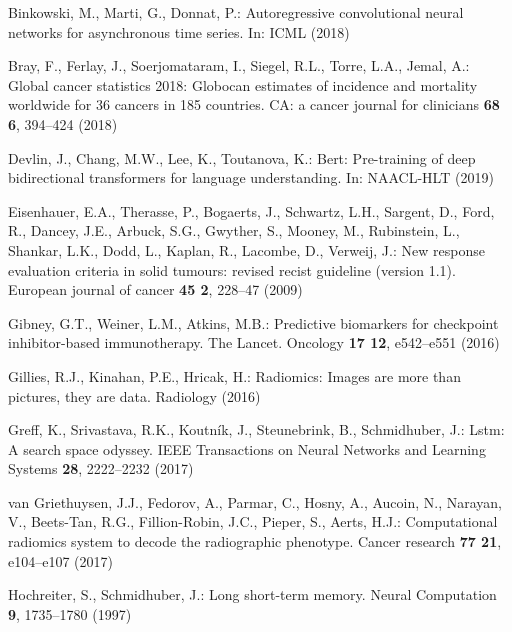 \documentclass[runningheads]{llncs}
\begin{document}

\begin{thebibliography}{10}
\providecommand{\url}[1]{\texttt{#1}}
\providecommand{\urlprefix}{URL }
\providecommand{\doi}[1]{https://doi.org/#1}

Binkowski, M., Marti, G., Donnat, P.: Autoregressive convolutional neural
  networks for asynchronous time series. In: ICML (2018)

Bray, F., Ferlay, J., Soerjomataram, I., Siegel, R.L., Torre, L.A., Jemal, A.:
  Global cancer statistics 2018: Globocan estimates of incidence and mortality
  worldwide for 36 cancers in 185 countries. CA: a cancer journal for
  clinicians  \textbf{68 6},  394--424 (2018)

Devlin, J., Chang, M.W., Lee, K., Toutanova, K.: Bert: Pre-training of deep
  bidirectional transformers for language understanding. In: NAACL-HLT (2019)

Eisenhauer, E.A., Therasse, P., Bogaerts, J., Schwartz, L.H., Sargent, D.,
  Ford, R., Dancey, J.E., Arbuck, S.G., Gwyther, S., Mooney, M., Rubinstein,
  L., Shankar, L.K., Dodd, L., Kaplan, R., Lacombe, D., Verweij, J.: New
  response evaluation criteria in solid tumours: revised recist guideline
  (version 1.1). European journal of cancer  \textbf{45 2},  228--47 (2009)

Gibney, G.T., Weiner, L.M., Atkins, M.B.: Predictive biomarkers for checkpoint
  inhibitor-based immunotherapy. The Lancet. Oncology  \textbf{17 12},
  e542--e551 (2016)

Gillies, R.J., Kinahan, P.E., Hricak, H.: Radiomics: Images are more than
  pictures, they are data. Radiology  (2016)

Greff, K., Srivastava, R.K., Koutn{\'i}k, J., Steunebrink, B., Schmidhuber, J.:
  Lstm: A search space odyssey. IEEE Transactions on Neural Networks and
  Learning Systems  \textbf{28},  2222--2232 (2017)

van Griethuysen, J.J., Fedorov, A., Parmar, C., Hosny, A., Aucoin, N., Narayan,
  V., Beets-Tan, R.G., Fillion-Robin, J.C., Pieper, S., Aerts, H.J.:
  Computational radiomics system to decode the radiographic phenotype. Cancer
  research  \textbf{77 21},  e104--e107 (2017)

Hochreiter, S., Schmidhuber, J.: Long short-term memory. Neural Computation
  \textbf{9},  1735--1780 (1997)


\end{thebibliography}
\end{document}
